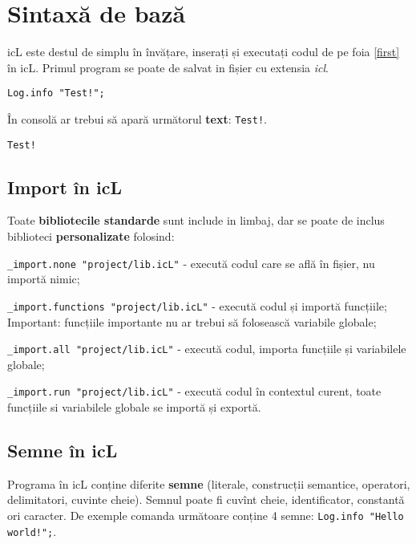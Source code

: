 \section{Sintaxă de bază}

icL este destul de simplu în învățare, inserați și executați codul de pe foia \ref{first} în icL. Primul program se poate de salvat in fișier cu extensia \textit{icl}.

\begin{lstlisting}[caption=Prima programă, label=first]
Log.info "Test!";
\end{lstlisting}

În consolă ar trebui să apară următorul \textbf{text}: \lstinline|Test!|.

\begin{lstlisting}[numbers=none]
Test!
\end{lstlisting}

\subsection{Import în icL}

Toate \textbf{bibliotecile standarde} sunt include in limbaj, dar se poate de inclus biblioteci \textbf{personalizate} folosind:

\begin{icItems}
\item
	\lstinline|_import.none "project/lib.icL"| - execută codul care se află în fișier, nu importă nimic;
\item
	\lstinline|_import.functions "project/lib.icL"| - execută codul și importă funcțiile; {\color{red}Important:} funcțiile importante nu ar trebui să folosească variabile globale;
\item
	\lstinline|_import.all "project/lib.icL"| -  execută codul, importa funcțiile și variabilele globale;
\item
	\lstinline|_import.run "project/lib.icL"| - execută codul în contextul curent, toate funcțiile si variabilele globale se importă și exportă.
\end{icItems}

\subsection{Semne în icL}

Programa în icL conține diferite \textbf{semne} (literale, construcții semantice, operatori, delimitatori, cuvinte cheie). Semnul poate fi cuvînt cheie, identificator, constantă ori caracter. De exemple comanda următoare conține 4 semne: \lstinline|Log.info "Hello world!";|.

